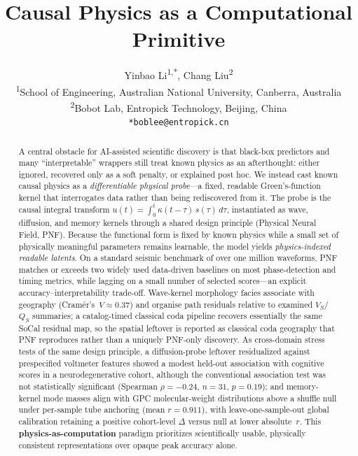 \documentclass[twocolumn, 10pt]{article}
\title{
  Causal Physics as a Computational Primitive
}
\author{
  Yinbao Li\textsuperscript{1,*}, Chang Liu\textsuperscript{2} \\
  \textsuperscript{1}School of Engineering, Australian National University, Canberra, Australia \\
  \textsuperscript{2}Bobot Lab, Entropick Technology, Beijing, China \\
  \texttt{*boblee@entropick.cn}
}
\date{}
\begin{document}

\maketitle

\begin{abstract}
\noindent
A central obstacle for AI-assisted scientific discovery is that black-box predictors and many ``interpretable'' wrappers still treat known physics as an afterthought: either ignored, recovered only as a soft penalty, or explained post hoc. We instead cast known causal physics as a \emph{differentiable physical probe}---a fixed, readable Green's-function kernel that interrogates data rather than being rediscovered from it. The probe is the causal integral transform
\(u(t)=\int_{0}^{t}\kappa(t-\tau)\,s(\tau)\,d\tau\),
instantiated as wave, diffusion, and memory kernels through a shared design principle (Physical Neural Field, PNF). Because the functional form is fixed by known physics while a small set of physically meaningful parameters remains learnable, the model yields \emph{physics-indexed readable latents}. On a standard seismic benchmark of over one million waveforms, PNF matches or exceeds two widely used data-driven baselines on most phase-detection and timing metrics, while lagging on a small number of selected scores---an explicit accuracy--interpretability trade-off. Wave-kernel morphology facies associate with geography (Cramér's~$V\approx0.37$) and organise path residuals relative to examined \(V_S\)/\(Q_S\) summaries; a catalog-timed classical coda pipeline recovers essentially the same SoCal residual map, so the spatial leftover is reported as classical coda geography that PNF reproduces rather than a uniquely PNF-only discovery. As cross-domain stress tests of the same design principle, a diffusion-probe leftover residualized against prespecified voltmeter features showed a modest held-out association with cognitive scores in a neurodegenerative cohort, although the conventional association test was not statistically significant (Spearman $\rho=-0.24$, $n=31$, $p=0.19$); and memory-kernel mode masses align with GPC molecular-weight distributions above a shuffle null under per-sample tube anchoring (mean $r=0.911$), with leave-one-sample-out global calibration retaining a positive cohort-level $\Delta$ versus null at lower absolute~$r$. This \textbf{physics-as-computation} paradigm prioritizes scientifically usable, physically consistent representations over opaque peak accuracy alone.
\end{abstract}
\end{document}
